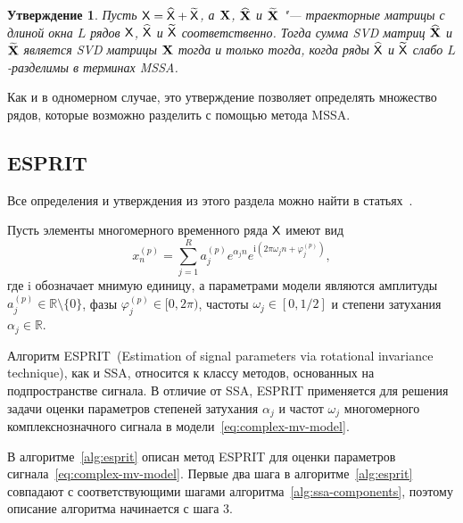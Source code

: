 \documentclass{article}
\theoremstyle{plain}
\newtheorem{statement}{Утверждение}[section]
\theoremstyle{definition}
\theoremstyle{remark}
\newcommand{\iu}{\mathrm{i}}
\begin{document}
\begin{statement}
  \label{state:mssa-separability}
  Пусть $\mathsf{X} = \widehat{\mathsf{X}} + \widetilde{\mathsf{X}}$, а $\mathbf{X}$, $\widehat{\mathbf{X}}$ и $\widetilde{\mathbf{X}}$ "--- траекторные
  матрицы с длиной окна $L$ рядов $\mathsf{X}$, $\widehat{\mathsf{X}}$ и $\widetilde{\mathsf{X}}$ соответственно.
  Тогда сумма \emph{SVD} матриц $\widehat{\mathbf{X}}$ и $\widetilde{\mathbf{X}}$ является \emph{SVD} матрицы $\mathbf{X}$ тогда и только тогда, когда
  ряды $\widehat{\mathsf{X}}$ и $\widetilde{\mathsf{X}}$ слабо $L$-разделимы в терминах MSSA.
\end{statement}
Как и в одномерном случае, это утверждение позволяет определять множество рядов, которые возможно разделить с
помощью метода MSSA.

\subsection{ESPRIT}\label{subsec:esprit}
Все определения и утверждения из этого раздела
можно найти в статьях~\cite{esprit,hosvd-hooi-separation}.

Пусть элементы многомерного временного ряда $\mathsf{X}$ имеют вид
\begin{equation}
  \label{eq:complex-mv-model}
  x_n^{(p)} = \sum_{j=1}^{R} a_j^{(p)} e^{ \alpha_j n }
  e^{\iu \left( 2 \pi \omega_j n + \varphi_j^{(p)}\right)},
\end{equation}
где $\iu$ обозначает мнимую единицу, а параметрами модели являются амплитуды
$a_j^{(p)} \in \mathbb{R}\setminus\{0\}$, фазы ${\varphi_j^{(p)} \in [0, 2\pi)}$,
частоты $\omega_j\in [0, 1/2]$ и степени затухания $\alpha_j \in \mathbb{R}$.

Алгоритм ESPRIT~(Estimation of signal parameters via rotational invariance technique), как
и SSA, относится к классу методов, основанных на подпространстве сигнала.
В отличие от SSA, ESPRIT применяется для решения задачи оценки параметров
степеней затухания $\alpha_j$ и частот $\omega_j$ многомерного комплекснозначного сигнала в модели~\eqref{eq:complex-mv-model}.

В алгоритме~\ref{alg:esprit} описан метод ESPRIT для оценки параметров
сигнала~\eqref{eq:complex-mv-model}.
Первые два шага в алгоритме~\ref{alg:esprit} совпадают с соответствующими шагами
алгоритма~\ref{alg:ssa-components}, поэтому описание алгоритма начинается с шага 3.
\end{document}
